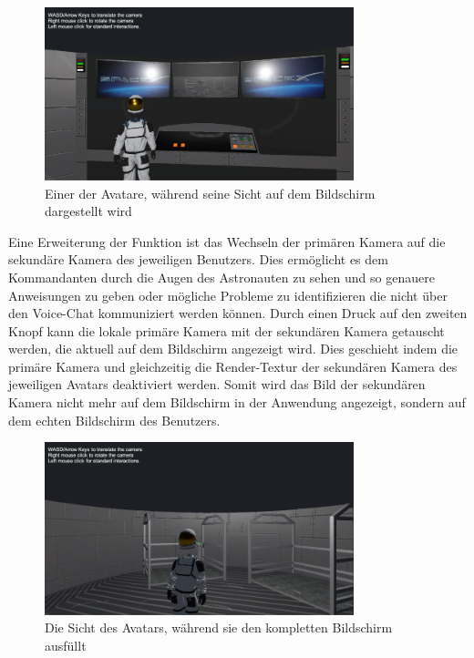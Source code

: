\begin{figure}[H]
\centering
\includegraphics[width=0.8\textwidth]{VirgosScreenview.PNG}
\caption{Einer der Avatare, während seine Sicht auf dem Bildschirm dargestellt wird}
\end{figure}

Eine Erweiterung der Funktion ist das Wechseln der primären Kamera auf die sekundäre Kamera des jeweiligen Benutzers. Dies ermöglicht es dem Kommandanten durch die Augen des Astronauten zu sehen und so genauere Anweisungen zu geben oder mögliche Probleme zu identifizieren die nicht über den Voice-Chat kommuniziert werden können. Durch einen Druck auf den zweiten Knopf kann die lokale primäre Kamera mit der sekundären Kamera getauscht werden, die aktuell auf dem Bildschirm angezeigt wird. Dies geschieht indem die primäre Kamera und gleichzeitig die Render-Textur der sekundären Kamera des jeweiligen Avatars deaktiviert werden. Somit wird das Bild der sekundären Kamera nicht mehr auf dem Bildschirm in der Anwendung angezeigt, sondern auf dem echten Bildschirm des Benutzers. 

\begin{figure}[H]
\centering
\includegraphics[width=0.8\textwidth]{ScreenDuplicate.PNG}
\caption{Die Sicht des Avatars, während sie den kompletten Bildschirm ausfüllt}
\end{figure}

